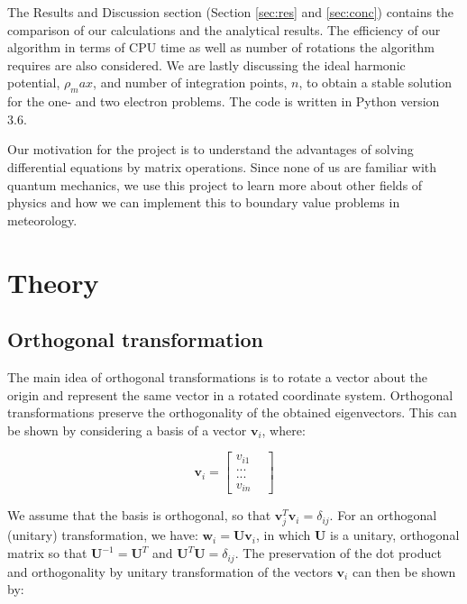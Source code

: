 \documentclass{article}
\begin{document}
\medskip

The Results and Discussion section (Section \ref{sec:res} and \ref{sec:conc}) contains the comparison of our calculations and the analytical results. The efficiency of our algorithm in terms of CPU time as well as number of rotations the algorithm requires are also considered. We are lastly discussing the ideal harmonic potential, $\rho_max$, and number of integration points, $n$, to obtain a stable solution for the one- and two electron problems. The code is written in Python version 3.6. 

\medskip

Our motivation for the project is to understand the advantages of solving differential equations by matrix operations. Since none of us are familiar with quantum mechanics, we use this project to learn more about other fields of physics and how we can implement this to boundary value problems in meteorology.  

\section{Theory}

\subsection{Orthogonal transformation} %

The main idea of orthogonal transformations is to rotate a vector about the origin and represent the same vector in a rotated coordinate system. Orthogonal transformations preserve the orthogonality of the obtained eigenvectors.  This can be shown by considering a basis of a vector $\textbf{v}_i$, where:

\[
\textbf{v}_i = 
\begin{bmatrix}
    v_{i1}&\\...&\\...&\\ v_{in}
\end{bmatrix}
\]

We assume that the basis is orthogonal, so that $\textbf{v}_j^T\textbf{v}_i = \delta_{ij}$. For an orthogonal (unitary) transformation, we have:  $\textbf{w}_i = \textbf{U}\textbf{v}_i$, in which $\textbf{U}$ is a unitary, orthogonal matrix so that $\textbf{U}^{-1} = \textbf{U}^T$ and $\textbf{U}^T\textbf{U} = \delta_{ij}$. The preservation of the dot product and orthogonality by unitary transformation of the vectors $\textbf{v}_i$ can then be shown by:
\end{document}
